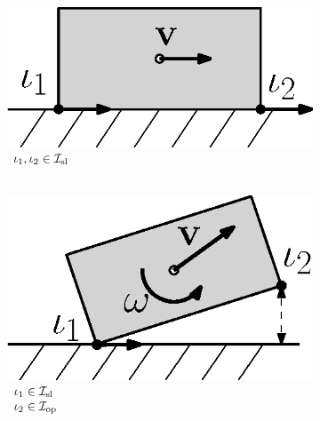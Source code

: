 \documentclass[../DC2019003Bouma.tex]{subfiles}
\begin{document}
\begin{figure}[bt!]
\begin{subfigure}[b]{0.17\textwidth}
\end{subfigure}
\quad
\begin{subfigure}[b]{0.17\textwidth}   
\centering 
\includegraphics[width=\textwidth]{example3.eps}
\caption{$\begin{array}{l}
\iota_1,\iota_2\in\mathcal{I}_{\textnormal{sl}}\\ \hspace{0cm}
\end{array}$}
\label{fig:2example3}
\end{subfigure}
\quad
\begin{subfigure}[b]{0.17\textwidth}  
\centering 
\includegraphics[width=\textwidth]{example4.eps}
\caption{$\begin{array}{l}
\iota_1\in\mathcal{I}_{\textnormal{sl}}\\\iota_2\in\mathcal{I}_{\textnormal{op}}
\end{array}$}
\label{fig:2example4}
\end{subfigure}
\quad
\begin{subfigure}[b]{0.17\textwidth}   
\centering 

\end{subfigure}
\end{figure}
\end{document}
